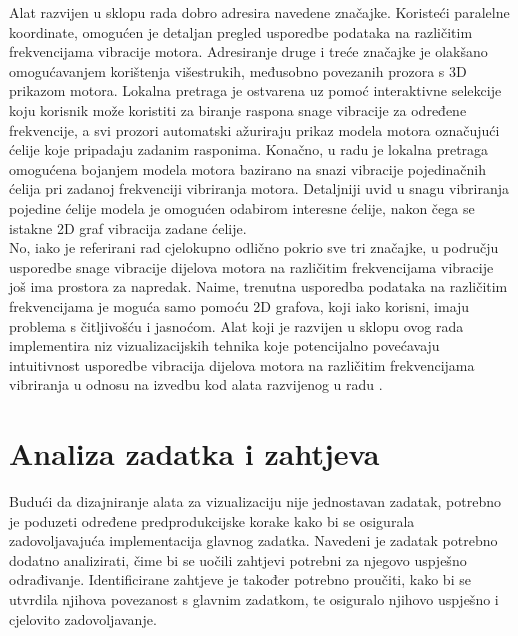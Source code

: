 \documentclass[times, utf8, diplomski]{fer}
\begin{document}
Alat razvijen u sklopu rada \citep{matkovic2021getting} dobro adresira navedene značajke. Koristeći paralelne koordinate, omogućen je detaljan pregled usporedbe podataka na različitim frekvencijama vibracije motora. Adresiranje druge i treće značajke je olakšano omogućavanjem korištenja višestrukih, međusobno povezanih prozora s 3D prikazom motora. Lokalna pretraga je ostvarena uz pomoć interaktivne selekcije koju korisnik može koristiti za biranje raspona snage vibracije za određene frekvencije, a svi prozori automatski ažuriraju prikaz modela motora označujući ćelije koje pripadaju zadanim rasponima. Konačno, u radu \citep{matkovic2021getting} je lokalna pretraga omogućena bojanjem modela motora bazirano na snazi vibracije pojedinačnih ćelija pri zadanoj frekvenciji vibriranja motora. Detaljniji uvid u snagu vibriranja pojedine ćelije modela je omogućen odabirom interesne ćelije, nakon čega se istakne 2D graf vibracija  zadane ćelije.\\

No, iako je referirani rad cjelokupno odlično pokrio sve tri značajke, u području usporedbe snage vibracije dijelova motora na različitim frekvencijama vibracije još ima prostora za napredak. Naime, trenutna usporedba podataka na različitim frekvencijama je moguća samo pomoću 2D grafova, koji iako korisni, imaju problema s čitljivošću i jasnoćom. Alat koji je razvijen u sklopu ovog rada implementira niz vizualizacijskih tehnika koje potencijalno povećavaju intuitivnost usporedbe vibracija dijelova motora na različitim frekvencijama vibriranja u odnosu na izvedbu kod alata razvijenog u radu \citep{matkovic2021getting}.

\chapter{Analiza zadatka i zahtjeva}
Budući da dizajniranje alata za vizualizaciju nije jednostavan zadatak, potrebno je poduzeti određene predprodukcijske korake kako bi se osigurala zadovoljavajuća implementacija glavnog zadatka. Navedeni je zadatak potrebno dodatno analizirati, čime bi se uočili zahtjevi potrebni za njegovo uspješno odrađivanje. Identificirane zahtjeve je također potrebno proučiti, kako bi se utvrdila njihova povezanost s glavnim zadatkom, te osiguralo njihovo uspješno i cjelovito zadovoljavanje. 
\end{document}
